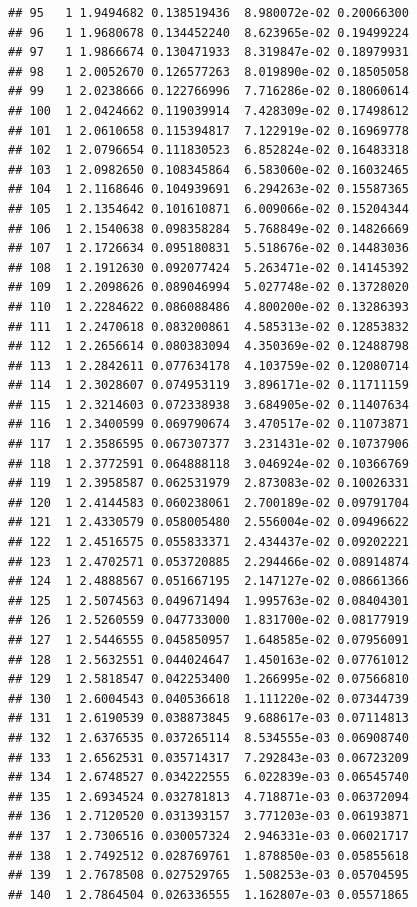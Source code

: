 \documentclass[article]{jss}\usepackage[]{graphicx}\usepackage[]{xcolor}
\makeatletter
\newenvironment{kframe}{%
 \def\at@end@of@kframe{}%
 \ifinner\ifhmode%
  \def\at@end@of@kframe{\end{minipage}}%
  \begin{minipage}{\columnwidth}%
 \fi\fi%
 \def\FrameCommand##1{\hskip\@totalleftmargin \hskip-\fboxsep
 \colorbox{shadecolor}{##1}\hskip-\fboxsep
     \hskip-\linewidth \hskip-\@totalleftmargin \hskip\columnwidth}%
 \MakeFramed {\advance\hsize-\width
   \@totalleftmargin\z@ \linewidth\hsize
   \@setminipage}}%
 {\par\unskip\endMakeFramed%
 \at@end@of@kframe}
\newenvironment{knitrout}{}{} %
\makeatother
\begin{document}
\begin{knitrout}
\begin{kframe}
\begin{verbatim}
## 95   1 1.9494682 0.138519436  8.980072e-02 0.20066300
## 96   1 1.9680678 0.134452240  8.623965e-02 0.19499224
## 97   1 1.9866674 0.130471933  8.319847e-02 0.18979931
## 98   1 2.0052670 0.126577263  8.019890e-02 0.18505058
## 99   1 2.0238666 0.122766996  7.716286e-02 0.18060614
## 100  1 2.0424662 0.119039914  7.428309e-02 0.17498612
## 101  1 2.0610658 0.115394817  7.122919e-02 0.16969778
## 102  1 2.0796654 0.111830523  6.852824e-02 0.16483318
## 103  1 2.0982650 0.108345864  6.583060e-02 0.16032465
## 104  1 2.1168646 0.104939691  6.294263e-02 0.15587365
## 105  1 2.1354642 0.101610871  6.009066e-02 0.15204344
## 106  1 2.1540638 0.098358284  5.768849e-02 0.14826669
## 107  1 2.1726634 0.095180831  5.518676e-02 0.14483036
## 108  1 2.1912630 0.092077424  5.263471e-02 0.14145392
## 109  1 2.2098626 0.089046994  5.027748e-02 0.13728020
## 110  1 2.2284622 0.086088486  4.800200e-02 0.13286393
## 111  1 2.2470618 0.083200861  4.585313e-02 0.12853832
## 112  1 2.2656614 0.080383094  4.350369e-02 0.12488798
## 113  1 2.2842611 0.077634178  4.103759e-02 0.12080714
## 114  1 2.3028607 0.074953119  3.896171e-02 0.11711159
## 115  1 2.3214603 0.072338938  3.684905e-02 0.11407634
## 116  1 2.3400599 0.069790674  3.470517e-02 0.11073871
## 117  1 2.3586595 0.067307377  3.231431e-02 0.10737906
## 118  1 2.3772591 0.064888118  3.046924e-02 0.10366769
## 119  1 2.3958587 0.062531979  2.873083e-02 0.10026331
## 120  1 2.4144583 0.060238061  2.700189e-02 0.09791704
## 121  1 2.4330579 0.058005480  2.556004e-02 0.09496622
## 122  1 2.4516575 0.055833371  2.434437e-02 0.09202221
## 123  1 2.4702571 0.053720885  2.294466e-02 0.08914874
## 124  1 2.4888567 0.051667195  2.147127e-02 0.08661366
## 125  1 2.5074563 0.049671494  1.995763e-02 0.08404301
## 126  1 2.5260559 0.047733000  1.831700e-02 0.08177919
## 127  1 2.5446555 0.045850957  1.648585e-02 0.07956091
## 128  1 2.5632551 0.044024647  1.450163e-02 0.07761012
## 129  1 2.5818547 0.042253400  1.266995e-02 0.07566810
## 130  1 2.6004543 0.040536618  1.111220e-02 0.07344739
## 131  1 2.6190539 0.038873845  9.688617e-03 0.07114813
## 132  1 2.6376535 0.037265114  8.534555e-03 0.06908740
## 133  1 2.6562531 0.035714317  7.292843e-03 0.06723209
## 134  1 2.6748527 0.034222555  6.022839e-03 0.06545740
## 135  1 2.6934524 0.032781813  4.718871e-03 0.06372094
## 136  1 2.7120520 0.031393157  3.771203e-03 0.06193871
## 137  1 2.7306516 0.030057324  2.946331e-03 0.06021717
## 138  1 2.7492512 0.028769761  1.878850e-03 0.05855618
## 139  1 2.7678508 0.027529765  1.508253e-03 0.05704595
## 140  1 2.7864504 0.026336555  1.162807e-03 0.05571865

\end{verbatim}
\end{kframe}
\end{knitrout}
\end{document}
